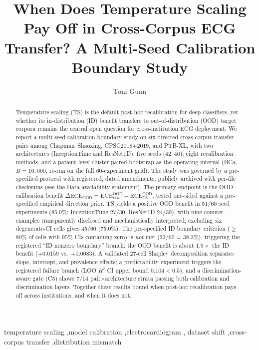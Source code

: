 \documentclass[review,12pt,nonatbib]{elsarticle}
\title{When Does Temperature Scaling Pay Off in Cross-Corpus ECG Transfer? A Multi-Seed Calibration Boundary Study}
\author[inst1]{Toni Guan\corref{cor1}}
\affiliation[inst1]{organization={College of Information Technology, Shenyang Institute of Technology},
  city={Shenyang}, state={Liaoning}, country={China}}
\begin{document}
\linenumbers
\begin{frontmatter}

\begin{abstract}
Temperature scaling (TS) is the default post-hoc recalibration for deep
classifiers, yet whether its in-distribution (ID) benefit transfers to
out-of-distribution (OOD) target corpora remains the central open question
for cross-institution ECG deployment. We report a multi-seed calibration
boundary study on six directed cross-corpus transfer pairs among
Chapman--Shaoxing, CPSC2018+2019, and PTB-XL, with two architectures
(InceptionTime and ResNet1D), five seeds (42--46), eight recalibration
methods, and a patient-level cluster paired bootstrap as the operating
interval (BCa, $B=10{,}000$, re-run on the full 60-experiment grid). The
study was governed by a pre-specified protocol with registered, dated
amendments, publicly archived with per-file checksums (see the Data
availability statement). The primary endpoint is the OOD calibration
benefit $\Delta\text{ECE}_{\text{OOD}}=\text{ECE}_{\mathrm{raw}}^{\mathrm{OOD}}
-\text{ECE}_{\mathrm{TS}}^{\mathrm{OOD}}$, tested one-sided against a
pre-specified empirical direction prior. TS yields a positive OOD benefit in
51/60 seed experiments (85.0\%; InceptionTime 27/30, ResNet1D 24/30), with
nine counter-examples transparently disclosed and mechanistically
interpreted; excluding six degenerate-CI cells gives 45/60 (75.0\%). The
pre-specified ID boundary criterion ($\geq$80\% of cells with 95\% CIs
containing zero) is \emph{not} met (23/60 = 38.3\%), triggering the
registered ``ID nonzero boundary'' branch: the OOD benefit is about
$1.9\times$ the ID benefit ($+0.0159$ vs.\ $+0.0083$). A validated 27-cell
Shapley decomposition separates slope, intercept, and prevalence effects; a
predictability experiment triggers the registered failure branch (LOO $R^2$
CI upper bound $0.104<0.5$); and a discrimination-aware gate (C5) shows 7/14
pair$\times$architecture strata passing both calibration and discrimination
layers. Together these results bound when post-hoc recalibration pays off
across institutions, and when it does not.
\end{abstract}

\begin{keyword}
temperature scaling \sep model calibration \sep electrocardiogram \sep
dataset shift \sep cross-corpus transfer \sep distribution mismatch
\end{keyword}

\end{frontmatter}
\end{document}
